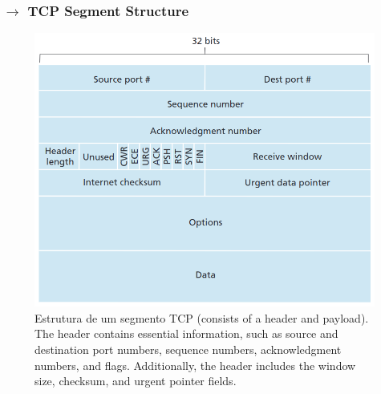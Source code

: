 \subsubsection[3.5.2 TCP Segment Structure]{$\pmb{\rightarrow}$ TCP Segment Structure}

\vspace{-0.5em}
\begin{figure}[H]
    \centering
    \includegraphics[width = 0.55\linewidth]{img/3/TCP-segment.png}
    \caption{Estrutura de um segmento TCP (consists of a header and payload). The header contains essential information, such as source and destination port numbers, sequence numbers, acknowledgment numbers, and flags. Additionally, the header includes the window size, checksum, and urgent pointer fields.}
    \label{fig:seg-TCP}
\end{figure}

